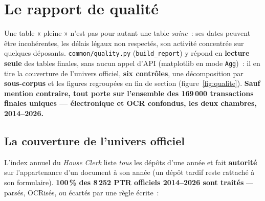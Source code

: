\documentclass[11pt,a4paper]{article}
\newcommand{\co}[1]{\texttt{\small #1}}
\begin{document}
\section{Le rapport de qualité}
\label{sec:qualite}

Une table « pleine » n'est pas pour autant une table \emph{saine}~: ses dates peuvent être incohérentes,
les délais légaux non respectés, son activité concentrée sur quelques déposants. \co{common/quality.py}
(\co{build_report}) y répond en \textbf{lecture seule} des tables finales, sans aucun appel d'API
(matplotlib en mode \co{Agg})~: il en tire la couverture de l'univers officiel, \textbf{six contrôles}, une
décomposition par \textbf{sous-corpus} et les figures regroupées en fin de section
(figure~\ref{fig:qualite}). \textbf{Sauf mention contraire, tout porte sur l'ensemble des 169\,000
transactions finales uniques — électronique et OCR confondus, les deux chambres, 2014--2026.}

\subsection{La couverture de l'univers officiel}
\label{sec:couverture}
L'index annuel du \emph{House Clerk} liste \emph{tous} les dépôts d'une année et fait \textbf{autorité} sur
l'appartenance d'un document à son année (un dépôt tardif reste rattaché à son formulaire). \textbf{100\,\%
des 8\,252 PTR officiels 2014--2026 sont traités} — parsés, OCRisés, ou écartés par une règle écrite~:
\end{document}
